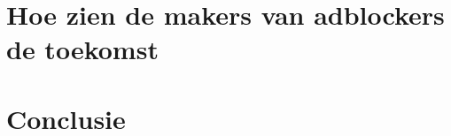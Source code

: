 \documentclass[pdftex,a4paper,12pt,twoside]{report}
\begin{document}
\chapter{Hoe zien de makers van adblockers de toekomst}
\label{ch:Hoe zien de makers van adblockers de toekomst}

\chapter{Conclusie}
\label{ch:conclusie}








\listoffigures
\listoftables
\end{document}
